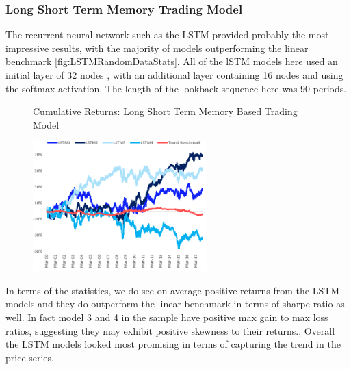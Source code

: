 \documentclass[11pt]{article}
\begin{document}
\subsubsection{Long Short Term Memory Trading Model}
The recurrent neural network such as the LSTM provided probably the most impressive results, with the majority of models outperforming the linear benchmark \ref{fig:LSTMRandomDataStats}. All of the lSTM models here used an initial layer of 32 nodes , with an additional layer containing 16 nodes and using the softmax activation. The length of the lookback sequence here was 90 periods.
\begin{figure}[h]
    \centering
	\caption{Cumulative Returns: Long Short Term Memory Based Trading Model}    
	\includegraphics[width=0.6\textwidth]{LSTMRandomDataResults}
    \label{fig:LSTMRandomDataResults}
     \caption*{}
\end{figure}

In terms of the statistics, we do see on average positive returns from the LSTM models and they do outperform the linear benchmark in terms of sharpe ratio as well. In fact model 3 and 4 in the sample have positive max gain to max loss ratios, suggesting they may exhibit positive skewness to their returns., Overall the LSTM models looked most promising in terms of capturing the trend in the price series.
\end{document}

